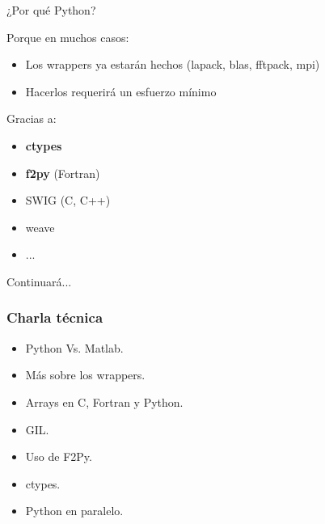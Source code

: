 \documentclass{beamer}
\begin{document}
\begin{frame}
 \begin{center}
  \begin{Huge}
   ¿Por qué Python?
  \end{Huge}
\end{center}
\end{frame}

\begin{frame}
 Porque en muchos casos:
\begin{itemize}
 \item Los wrappers ya estarán hechos (lapack, blas, fftpack, mpi)
 \item Hacerlos requerirá un esfuerzo mínimo
\end{itemize}
Gracias a:
\begin{itemize}
 \item \textbf{ctypes}
 \item \textbf{f2py} (Fortran)
 \item SWIG (C, C++)
 \item weave
 \item ...
\end{itemize}
\end{frame}

\begin{frame}
\begin{center}
 \begin{Huge}
  Continuará...
 \end{Huge}
\end{center}
\end{frame}

\begin{frame}
 \frametitle{Charla técnica}
\begin{itemize}
 \item Python Vs. Matlab.
 \item Más sobre los wrappers.
 \item Arrays en C, Fortran y Python.
 \item GIL.
 \item Uso de F2Py.
 \item ctypes.
 \item Python en paralelo.
\end{itemize}

\end{frame}
\end{document}
